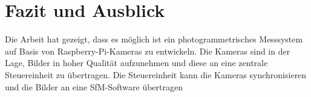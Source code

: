\documentclass[./00PhotoBox.tex]{subfiles}
\begin{document}
\chapter{Fazit und Ausblick}

Die Arbeit hat gezeigt, dass es möglich ist ein photogrammetrisches Messsystem auf Basis von Raspberry-Pi-Kameras zu entwickeln. Die Kameras sind in der Lage, Bilder in hoher Qualität aufzunehmen und diese an eine zentrale Steuereinheit zu übertragen. Die Steuereinheit kann die Kameras synchronisieren und die Bilder an eine \gls{SfM}-Software übertragen




\biblio
\end{document}
